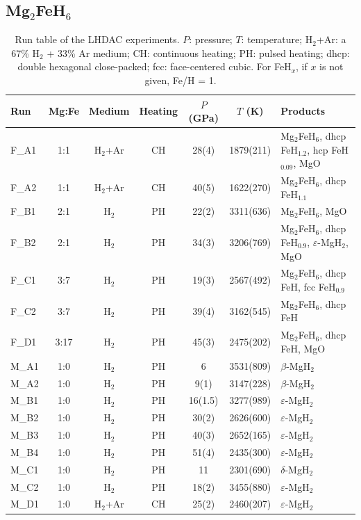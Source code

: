 \documentclass[draft,jgrga,12pt]{agujournal2019}
\begin{document}
\subsection{Mg$_2$FeH$_6$}


\begin{table}[!h]
    \centering
    \caption{Run table of the LHDAC experiments. 
    $P$: pressure; $T$: temperature; H$_2$+Ar: a 67\% H$_2$ + 33\% Ar medium;
    CH: continuous heating; PH: pulsed heating; 
    dhcp: double hexagonal close-packed; fcc: face-centered cubic. 
    For FeH$_x$, if $x$ is not given, Fe/H = 1.
    }
    {\scriptsize
    \begin{tabular}{lcccccl}
    \hline
     Run   & Mg:Fe & Medium & Heating &$P$ (GPa) & $T$ (K) & Products \\
     \hline
     F\_A1    & 1:1  & H$_2$+Ar & CH & 28(4) & 1879(211) &  Mg$_2$FeH$_6$, dhcp FeH$_{1.2}$, hcp FeH$_{0.09}$, MgO\\
     F\_A2    & 1:1  & H$_2$+Ar  & CH & 40(5) & 1622(270) &  Mg$_2$FeH$_6$, dhcp FeH$_{1.1}$ \\
     F\_B1    & 2:1  & H$_2$  & PH   & 22(2) & 3311(636)&  Mg$_2$FeH$_6$, MgO \\
     F\_B2    & 2:1  & H$_2$ &PH  & 34(3) & 3206(769)&  Mg$_2$FeH$_6$, dhcp FeH$_{0.9}$, $\varepsilon$-MgH$_2$, MgO \\
     F\_C1    & 3:7  & H$_2$ &PH & 19(3) & 2567(492) &  Mg$_2$FeH$_6$, dhcp FeH, fcc FeH$_{0.9}$ \\
     F\_C2    & 3:7  & H$_2$ &PH  & 39(4) & 3162(545) &  Mg$_2$FeH$_6$, dhcp FeH \\
     F\_D1    & 3:17 & H$_2$ &PH & 45(3)& 2475(202) &  Mg$_2$FeH$_6$, dhcp FeH, MgO \\

       M\_A1   & 1:0 & H$_2$ &PH & 6      & 3531(809)  & $\beta$-MgH$_2$ \\
      M\_A2   & 1:0 & H$_2$ &PH & 9(1)   & 3147(228)  & $\beta$-MgH$_2$  \\
      M\_B1  & 1:0 & H$_2$ &PH & 16(1.5) & 3277(989) & $\varepsilon$-MgH$_2$ \\
      M\_B2  & 1:0 & H$_2$ &PH & 30(2)   & 2626(600) & $\varepsilon$-MgH$_2$ \\
      M\_B3  & 1:0 & H$_2$ &PH & 40(3)   & 2652(165) & $\varepsilon$-MgH$_2$ \\
      M\_B4 & 1:0 & H$_2$ &PH  & 51(4)   & 2435(300) & $\varepsilon$-MgH$_2$ \\
      M\_C1  & 1:0 & H$_2$ &PH & 11      & 2301(690) & $\delta$-MgH$_2$ \\
      M\_C2  & 1:0 & H$_2$ &PH & 18(2)   & 3455(880) & $\varepsilon$-MgH$_2$\\
      M\_D1  & 1:0 & H$_2$+Ar &CH & 25(2)   & 2460(207) & $\varepsilon$-MgH$_2$\\
      
     \hline
    \end{tabular}}
    \label{tab:runtable}
\end{table}
\end{document}
